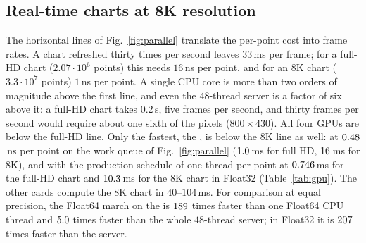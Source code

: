 \subsection{Real-time charts at 8K resolution}\label{sec:parallel-realtime}

\begin{table}[tb]
  \centering
  \caption{Brute-force charts of the fourth-order benchmark with the discrete
  march, one GPU thread per point, on four NVIDIA GPUs (Google Colab): median
  wall time of the kernel call in milliseconds, including launch and
  synchronization (full HD, $1920\times1080\approx2.07\cdot10^{6}$ points, ten
  repetitions; 8K, $7680\times4320\approx3.3\cdot10^{7}$ points, Float32,
  $\wmax=10^{5}$, five repetitions). $\wmax=10^{5}$ is the production window;
  $\wmax=15$ suffices for this model and is required by Float16, whose range
  ends at $65\,504$; in the Float16 column $\Dfun$ is evaluated in Float16 on a
  rescaled frequency axis while the march runs in Float32. The throughput
  column, in million points per second, refers to Float32. The timings of the
  T4 (passively cooled, 70\,W) scatter by up to a factor of two between cases
  under its thermal clock control -- its 8K chart costs half as much per point
  as its full-HD chart; at 8K the median exceeds the minimum by $18$--$28\,\%$
  on the A100 and the L4 as well.}\label{tab:gpu}
\end{table}


The horizontal lines of Fig.~\ref{fig:parallel} translate the per-point cost
into frame rates. A chart refreshed thirty times per second leaves
$33$\,ms per frame; for a full-HD chart ($2.07\cdot10^{6}$ points) this needs
$16$\,ns per point, and for an 8K chart ($3.3\cdot10^{7}$ points) $1$\,ns per
point. A single CPU core is more than two orders of magnitude above the first
line, and even the $48$-thread server is a factor of six above it: a full-HD
chart takes $0.2$\,s, five frames per second, and thirty frames per second
would require about one sixth of the pixels ($800\times430$). All four GPUs
are below the full-HD line. Only the fastest, the \GpuBest{}, is below the 8K
line as well: at $0.48$\,ns per point on the work queue of
Fig.~\ref{fig:parallel} ($1.0$\,ms for full HD, $16$\,ms
for 8K), and with the production schedule of one thread per point at
$0.746$\,ms for the full-HD chart and $10.3$\,ms for
the 8K chart in Float32 (Table~\ref{tab:gpu}). The other cards compute the 8K
chart in $40$--$104$\,ms. For comparison at equal precision, the Float64 march
on the \GpuBest{} is $189$ times faster than one Float64
CPU thread and $5.0$ times faster than the whole
$48$-thread server; in Float32 it is $207$ times faster than the
server.

